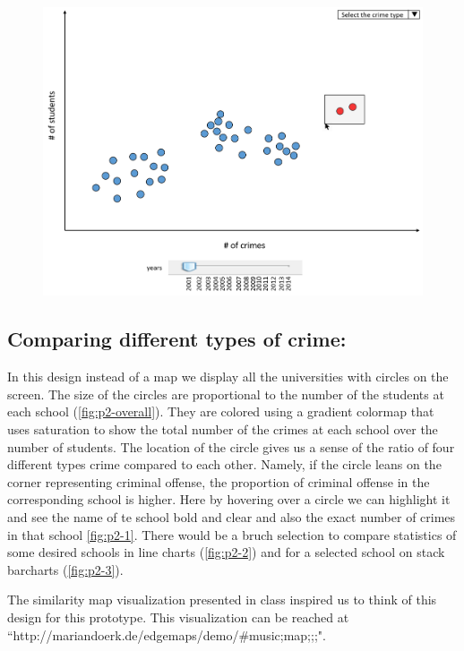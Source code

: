 \documentclass[12pt]{article}
\begin{document}
\begin{figure}[tbph]
   \centering{}
	       \includegraphics[width=6in]{prot3-2}           
\caption{}
\label{fig:p3-2}
\end{figure}


\subsection{Comparing different types of crime:\label{sec:prot3}} 
In this design instead of a map we display all the universities with circles on the screen. The size of the circles are proportional to the number of the students at each school (\cref{fig:p2-overall}). They are colored using a gradient colormap that uses saturation to show the total number of the crimes at each school over the number of students. The location of the circle gives us a sense of the ratio of four different types crime compared to each other. Namely, if the circle leans on the corner representing criminal offense, the proportion of criminal offense in the corresponding school is higher. Here by hovering over a circle we can highlight it and see the name of te school bold and clear and also the exact number of crimes in that school \cref{fig:p2-1}. There would be a bruch selection to compare statistics of some desired schools in line charts (\cref{fig:p2-2}) and for a selected school on stack barcharts (\cref{fig:p2-3}).

The similarity map visualization presented in class inspired us to think of this design for this prototype. This visualization can be reached at\\ ``http://mariandoerk.de/edgemaps/demo/{\#}music;map;;;".
\end{document}
